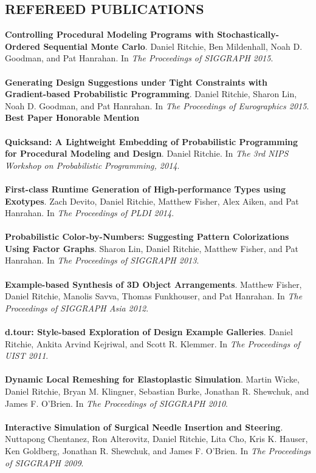 \documentclass[line,margin]{res}
\begin{document}
\begin{resume}
\section{REFEREED PUBLICATIONS}
\textbf{Controlling Procedural Modeling Programs with Stochastically-Ordered Sequential Monte Carlo}. 
Daniel Ritchie, Ben Mildenhall, Noah D. Goodman, and Pat Hanrahan. 
In \emph{The Proceedings of SIGGRAPH 2015}.
\\ \\
\textbf{Generating Design Suggestions under Tight Constraints with Gradient-based Probabilistic Programming}. 
Daniel Ritchie, Sharon Lin, Noah D. Goodman, and Pat Hanrahan. 
In \emph{The Proceedings of Eurographics 2015}. \textbf{Best Paper Honorable Mention}
\\ \\
\textbf{Quicksand: A Lightweight Embedding of Probabilistic Programming for Procedural Modeling and Design}. 
Daniel Ritchie. 
In \emph{The 3rd NIPS Workshop on Probabilistic Programming, 2014}.
\\ \\
\textbf{First-class Runtime Generation of High-performance Types using Exotypes}. 
Zach Devito, Daniel Ritchie, Matthew Fisher, Alex Aiken, and Pat Hanrahan. 
In \emph{The Proceedings of PLDI 2014}.
\\ \\
\textbf{Probabilistic Color-by-Numbers: Suggesting Pattern Colorizations Using Factor Graphs}. 
Sharon Lin, Daniel Ritchie, Matthew Fisher, and Pat Hanrahan. 
In \emph{The Proceedings of SIGGRAPH 2013}.
\\ \\
\textbf{Example-based Synthesis of 3D Object Arrangements}. 
Matthew Fisher, Daniel Ritchie, Manolis Savva, Thomas Funkhouser, and Pat Hanrahan. 
In \emph{The Proceedings of SIGGRAPH Asia 2012}.
\\ \\
\textbf{d.tour: Style-based Exploration of Design Example Galleries}. 
Daniel Ritchie, Ankita Arvind Kejriwal, and Scott R. Klemmer. 
In \emph{The Proceedings of UIST 2011}.
\\ \\
\textbf{Dynamic Local Remeshing for Elastoplastic Simulation}. 
Martin Wicke, Daniel Ritchie, Bryan M. Klingner, Sebastian Burke, Jonathan R. Shewchuk, and James F. O'Brien. 
In \emph{The Proceedings of SIGGRAPH 2010}.
\\ \\
\textbf{Interactive Simulation of Surgical Needle Insertion and Steering}. 
Nuttapong Chentanez, Ron Alterovitz, Daniel Ritchie, Lita Cho, Kris K. Hauser, Ken Goldberg, Jonathan R. Shewchuk, and James F. O'Brien. 
In \emph{The Proceedings of SIGGRAPH 2009}. 
 


\end{resume}
\end{document}
